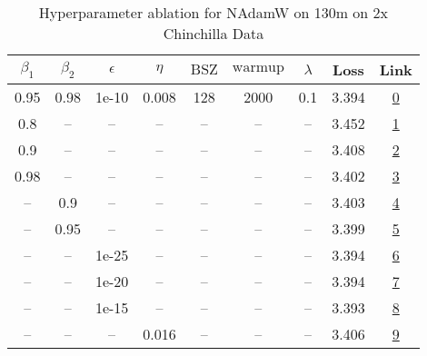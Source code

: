 \begin{table}[H]
\centering
\caption{Hyperparameter ablation for NAdamW on 130m on 2x Chinchilla Data}
\label{tab:ablation_nadamw_130m_2}
\begin{tabular}{ccccccccc}
\toprule
$\beta_1$ & $\beta_2$ & $\epsilon$ & $\eta$ & $\mathrm{BSZ}$ & $\mathrm{warmup}$ & $\lambda$ & Loss & Link \\
\midrule
0.95 & 0.98 & 1e-10 & 0.008 & 128 & 2000 & 0.1 & 3.394 & \href{https://wandb.ai/stanford-mercury/optimizer-scaling/runs/sweep-130m-5B-nadamw1c5657lr0.008-wd0.1-minlr0-warmup2000-b10.95-2e57b5}{0} \\
\midrule
0.8 & -- & -- & -- & -- & -- & -- & 3.452 & \href{https://wandb.ai/stanford-mercury/optimizer-scaling/runs/sweep-130m-5B-nadamw145e13lr0.008-wd0.1-minlr0-warmup2000-b10.8--6616c2}{1} \\
0.9 & -- & -- & -- & -- & -- & -- & 3.408 & \href{https://wandb.ai/stanford-mercury/optimizer-scaling/runs/sweep-130m-5B-nadamwc38fe0lr0.008-wd0.1-minlr0-warmup2000-b10.9--6a46e9}{2} \\
0.98 & -- & -- & -- & -- & -- & -- & 3.402 & \href{https://wandb.ai/stanford-mercury/optimizer-scaling/runs/sweep-130m-5B-nadamw32e168lr0.008-wd0.1-minlr0-warmup2000-b10.98-4a84a1}{3} \\
-- & 0.9 & -- & -- & -- & -- & -- & 3.403 & \href{https://wandb.ai/stanford-mercury/optimizer-scaling/runs/sweep-130m-5B-nadamw5addd4lr0.008-wd0.1-minlr0-warmup2000-b10.95-29b3aa}{4} \\
-- & 0.95 & -- & -- & -- & -- & -- & 3.399 & \href{https://wandb.ai/stanford-mercury/optimizer-scaling/runs/sweep-130m-5B-nadamwdd3b0blr0.008-wd0.1-minlr0-warmup2000-b10.95-20518c}{5} \\
-- & -- & 1e-25 & -- & -- & -- & -- & 3.394 & \href{https://wandb.ai/stanford-mercury/optimizer-scaling/runs/sweep-130m-5B-nadamwca7dc8lr0.008-wd0.1-minlr0-warmup2000-b10.95-6aab84}{6} \\
-- & -- & 1e-20 & -- & -- & -- & -- & 3.394 & \href{https://wandb.ai/stanford-mercury/optimizer-scaling/runs/sweep-130m-5B-nadamwf3a9adlr0.008-wd0.1-minlr0-warmup2000-b10.95-ab0d37}{7} \\
-- & -- & 1e-15 & -- & -- & -- & -- & 3.393 & \href{https://wandb.ai/stanford-mercury/optimizer-scaling/runs/sweep-130m-5B-nadamw153a2alr0.008-wd0.1-minlr0-warmup2000-b10.95-d349f4}{8} \\
-- & -- & -- & 0.016 & -- & -- & -- & 3.406 & \href{https://wandb.ai/stanford-mercury/optimizer-scaling/runs/sweep-130m-5B-nadamwf31525lr0.016-wd0.1-minlr0-warmup2000-b10.95-2feb0f}{9} \\

\end{tabular}
\end{table}
